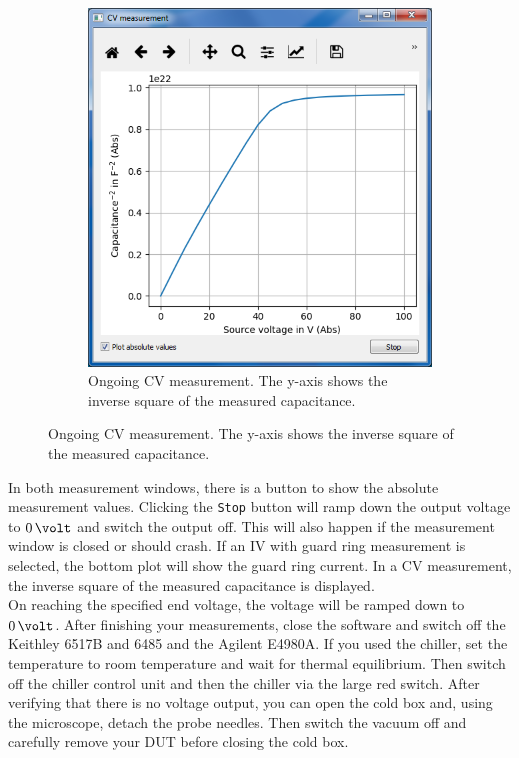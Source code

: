 \documentclass[a4paper]{article}
\begin{document}
\begin{figure}[hbtp]
\begin{subfigure}[t]{0.475\textwidth}
\includegraphics[width=\linewidth]{pictures/cvmeas.png}
\caption[Running CV Measurement]{Ongoing CV measurement. The y-axis shows the inverse square of the measured capacitance.}
\label{fig:cvmeas}
\end{subfigure}
\end{figure}

In both measurement windows, there is a button to show the absolute measurement values.
Clicking the {\tt Stop} button will ramp down the output voltage to $0\,\volt$ and switch the output off.
This will also happen if the measurement window is closed or should crash.
If an IV with guard ring measurement is selected, the bottom plot will show the guard ring current.
In a CV measurement, the inverse square of the measured capacitance is displayed.\\

On reaching the specified end voltage, the voltage will be ramped down to $0\,\volt$.
After finishing your measurements, close the software and switch off the Keithley 6517B and 6485 and the Agilent E4980A.
If you used the chiller, set the temperature to room temperature and wait for thermal equilibrium.
Then switch off the chiller control unit and then the chiller via the large red switch.
After verifying that there is no voltage output, you can open the cold box and, using the microscope, detach the probe needles.
Then switch the vacuum off and carefully remove your DUT before closing the cold box.\\
\end{document}
